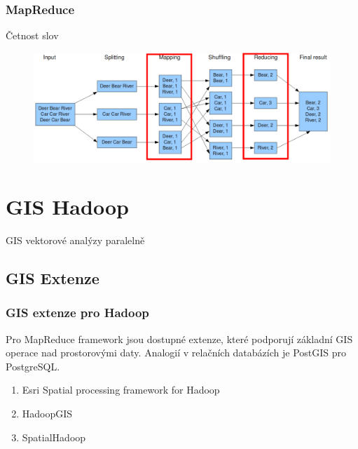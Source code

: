 \documentclass[unicode,bookmarksnumbered]{beamer}
\begin{document}
	\begin{frame}
		\frametitle{MapReduce}
		Četnost slov
		\begin{figure}
			\centering
			\includegraphics[width=1\textwidth]{./img/hadoop/maprede.png}
			\label{fig:eu_all}
		\end{figure}
	\end{frame}
%



	\section{GIS Hadoop}
	\begin{frame}[c]
		\begin{center}	
		\Huge GIS vektorové analýzy paralelně
		\end{center}
	\end{frame}
	
	
		\subsection{GIS Extenze}
		\begin{frame}
			\frametitle{GIS extenze pro Hadoop}
		Pro MapReduce framework jsou dostupné extenze, které podporují základní GIS
operace nad prostorovými daty. Analogií v relačních databázích je PostGIS
pro PostgreSQL.
			\begin{enumerate}
				\item Esri Spatial processing framework for Hadoop
				\item HadoopGIS
				\item SpatialHadoop
			\end{enumerate}
		\end{frame}
%
\end{document}
